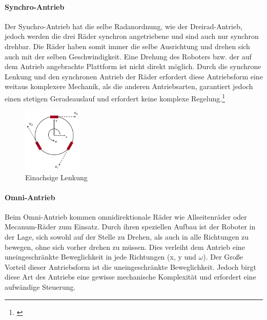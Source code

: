 \paragraph{Synchro-Antrieb}
\color{process}
Der Synchro-Antrieb hat die selbe Radanordnung, wie der Dreirad-Antrieb, jedoch werden die drei Räder synchron angetriebene und sind auch nur synchron drehbar. Die Räder haben somit immer die selbe Ausrichtung und drehen sich auch mit der selben Geschwindigkeit. Eine Drehung des Roboters bzw. der auf dem Antrieb angebrachte Plattform ist nicht direkt möglich.
\newline
Durch die synchrone Lenkung und den synchronen Antrieb der Räder erfordert diese Antriebsform eine weitaus komplexere Mechanik, als die anderen Antriebsarten, garantiert jedoch einen stetigen Geradeauslauf und erfordert keine komplexe Regelung.\footnote{\citep[vgl.][Mobile Roboter, Seite 107 f.]{Hertzberg.MobileRoboter}\label{note22}}
\begin{figure}
	\vspace{-0.5cm}
	\begin{center}
		\includegraphics[width=0.25\textwidth]{images/technische_grundlagen/Omniantrieb.png}
	\end{center}
	\caption{Einachsige Lenkung}
	\label{fig:einachsenlenkung}
\end{figure}
\paragraph{Omni-Antrieb}
\color{process}
Beim Omni-Antrieb kommen omnidirektionale Räder wie Allseitenräder oder Mecanum-Räder zum Einsatz. Durch ihren speziellen Aufbau ist der Roboter in der Lage, sich sowohl auf der Stelle zu Drehen, als auch in alle Richtungen zu bewegen, ohne sich vorher drehen zu müssen. Dies verleiht dem Antrieb eine uneingeschränkte Beweglichkeit in jede Richtungen (x, y und $\omega{}$).
\newline
Der Große Vorteil dieser Antriebsform ist die uneingeschränkte Beweglichkeit. Jedoch birgt diese Art des Antriebs eine gewisse mechanische Komplexität und erfordert eine aufwändige Steuerung.

